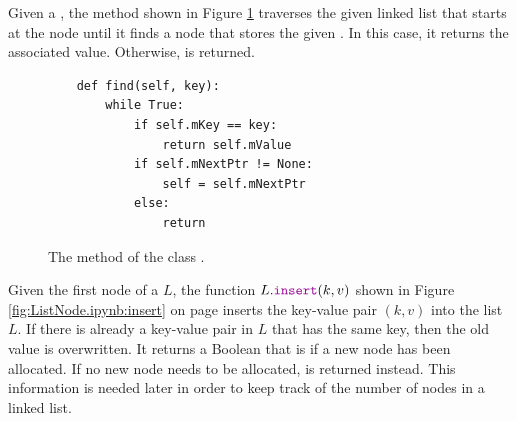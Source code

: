 Given a , the method  shown in Figure \ref{fig:ListNode.ipynb:find} traverses the
given linked list that starts at the node  until it finds a node that stores the 
given .  In this case, it returns the associated value.  Otherwise,  is returned.

\begin{figure}[!ht]
\centering
\begin{verbatim}
    def find(self, key):
        while True:
            if self.mKey == key:
                return self.mValue
            if self.mNextPtr != None:
                self = self.mNextPtr
            else:
                return
\end{verbatim}
\vspace*{-0.3cm}
\caption{The method  of the class .}
\label{fig:ListNode.ipynb:find}
\end{figure}

Given the first node of a  $L$, the function $L.\mytt{insert}(k, v)$ shown in Figure
\ref{fig:ListNode.ipynb:insert} on page \pageref{fig:ListNode.ipynb:insert} inserts the key-value pair $(k, v)$
into the list $L$.  If there is already a key-value pair in $L$ that has the same key, then the old value is
overwritten.  It returns a Boolean that is  if a new node has been allocated.  If no new node needs
to be allocated,  is returned instead.  This information is needed
later in order to keep track of the number of nodes in a linked list.

